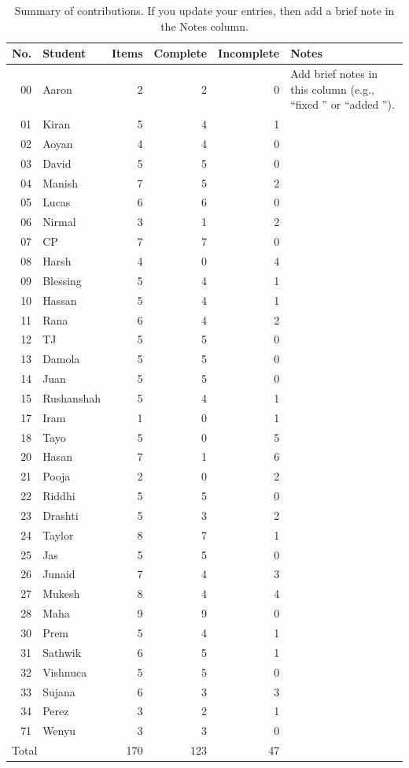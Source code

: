 \documentclass{article}
\begin{document}
\begin{table}[h]\small
\begin{tabular}{|r|l|r|r|r|p{}|}
\hline
No. & Student & Items & Complete & Incomplete & Notes \\
\hline
00 & Aaron & 2 & 2 & 0 & \raggedright Add brief notes in this column (e.g., ``fixed \cite{fan85debruijn}'' or ``added \cite{shiu1997decoding}''). \tabularnewline
01 & Kiran & 5 & 4 & 1 & \raggedright  \tabularnewline
02 & Aoyan & 4 & 4 & 0 & \raggedright  \tabularnewline
03 & David & 5 & 5 & 0 & \raggedright  \tabularnewline
04 & Manish & 7 & 5 & 2 & \raggedright  \tabularnewline
05 & Lucas & 6 & 6 & 0 & \raggedright  \tabularnewline
06 & Nirmal & 3 & 1 & 2 & \raggedright  \tabularnewline
07 & CP & 7 & 7 & 0 & \raggedright  \tabularnewline
08 & Harsh & 4 & 0 & 4 & \raggedright  \tabularnewline
09 & Blessing & 5 & 4 & 1 & \raggedright  \tabularnewline
10 & Hassan & 5 & 4 & 1 & \raggedright  \tabularnewline
11 & Rana & 6 & 4 & 2 & \raggedright \tabularnewline
12 & TJ & 5 & 5 & 0 & \raggedright \tabularnewline
13 & Damola & 5 & 5 & 0 & \raggedright  \tabularnewline
14 & Juan & 5 & 5 & 0 & \raggedright  \tabularnewline
15 & Rushanshah & 5 & 4 & 1 & \raggedright  \tabularnewline
17 & Iram & 1 & 0 & 1 & \raggedright  \tabularnewline
18 & Tayo & 5 & 0 & 5 & \raggedright  \tabularnewline
20 & Hasan & 7 & 1 & 6 & \raggedright  \tabularnewline
21 & Pooja & 2 & 0 & 2 & \raggedright  \tabularnewline
22 & Riddhi & 5 & 5 & 0 & \raggedright  \tabularnewline
23 & Drashti & 5 & 3 & 2 & \raggedright \tabularnewline
24 & Taylor & 8 & 7 & 1 & \raggedright  \tabularnewline
25 & Jas & 5 & 5 & 0 & \raggedright  \tabularnewline
26 & Junaid & 7 & 4 & 3 & \raggedright  \tabularnewline
27 & Mukesh & 8 & 4 & 4 & \raggedright \tabularnewline
28 & Maha & 9 & 9 & 0 & \raggedright  \tabularnewline
30 & Prem & 5 & 4 & 1 & \raggedright  \tabularnewline
31 & Sathwik & 6 & 5 & 1 & \raggedright  \tabularnewline
32 & Vishnuca & 5 & 5 & 0 & \raggedright  \tabularnewline
33 & Sujana & 6 & 3 & 3 & \raggedright  \tabularnewline
34 & Perez & 3 & 2 & 1 & \raggedright \tabularnewline
71 & Wenyu & 3 & 3 & 0 & \raggedright \tabularnewline
\hline
\multicolumn{2}{|l|}{Total} & 170 & 123 & 47 & \\
\hline
\end{tabular}
\caption{Summary of contributions.
If you update your entries, then add a brief note in the Notes column.}
\label{tab:contributions}
\end{table}
\end{document}
